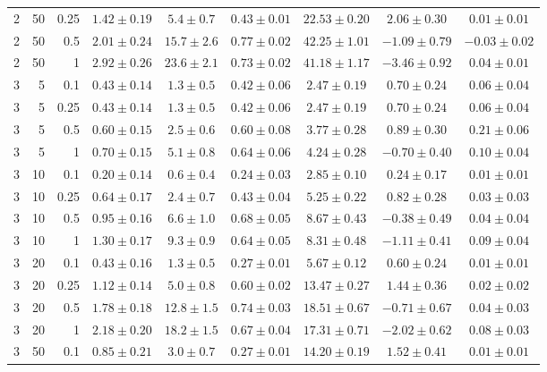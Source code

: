 \begin{table}[htbp]
\begin{tabular}{@{}rrrcccccc@{}}
2 & 50 & 0.25 & $1.42 \pm 0.19$ & $5.4 \pm 0.7$ & $0.43 \pm 0.01$ & $22.53 \pm 0.20$ & $2.06 \pm 0.30$ & $0.01 \pm 0.01$ \\
2 & 50 & 0.5 & $2.01 \pm 0.24$ & $15.7 \pm 2.6$ & $0.77 \pm 0.02$ & $42.25 \pm 1.01$ & $-1.09 \pm 0.79$ & $-0.03 \pm 0.02$ \\
2 & 50 & 1 & $2.92 \pm 0.26$ & $23.6 \pm 2.1$ & $0.73 \pm 0.02$ & $41.18 \pm 1.17$ & $-3.46 \pm 0.92$ & $0.04 \pm 0.01$ \\
\midrule
3 & 5 & 0.1 & $0.43 \pm 0.14$ & $1.3 \pm 0.5$ & $0.42 \pm 0.06$ & $2.47 \pm 0.19$ & $0.70 \pm 0.24$ & $0.06 \pm 0.04$ \\
3 & 5 & 0.25 & $0.43 \pm 0.14$ & $1.3 \pm 0.5$ & $0.42 \pm 0.06$ & $2.47 \pm 0.19$ & $0.70 \pm 0.24$ & $0.06 \pm 0.04$ \\
3 & 5 & 0.5 & $0.60 \pm 0.15$ & $2.5 \pm 0.6$ & $0.60 \pm 0.08$ & $3.77 \pm 0.28$ & $0.89 \pm 0.30$ & $0.21 \pm 0.06$ \\
3 & 5 & 1 & $0.70 \pm 0.15$ & $5.1 \pm 0.8$ & $0.64 \pm 0.06$ & $4.24 \pm 0.28$ & $-0.70 \pm 0.40$ & $0.10 \pm 0.04$ \\
3 & 10 & 0.1 & $0.20 \pm 0.14$ & $0.6 \pm 0.4$ & $0.24 \pm 0.03$ & $2.85 \pm 0.10$ & $0.24 \pm 0.17$ & $0.01 \pm 0.01$ \\
3 & 10 & 0.25 & $0.64 \pm 0.17$ & $2.4 \pm 0.7$ & $0.43 \pm 0.04$ & $5.25 \pm 0.22$ & $0.82 \pm 0.28$ & $0.03 \pm 0.03$ \\
3 & 10 & 0.5 & $0.95 \pm 0.16$ & $6.6 \pm 1.0$ & $0.68 \pm 0.05$ & $8.67 \pm 0.43$ & $-0.38 \pm 0.49$ & $0.04 \pm 0.04$ \\
3 & 10 & 1 & $1.30 \pm 0.17$ & $9.3 \pm 0.9$ & $0.64 \pm 0.05$ & $8.31 \pm 0.48$ & $-1.11 \pm 0.41$ & $0.09 \pm 0.04$ \\
3 & 20 & 0.1 & $0.43 \pm 0.16$ & $1.3 \pm 0.5$ & $0.27 \pm 0.01$ & $5.67 \pm 0.12$ & $0.60 \pm 0.24$ & $0.01 \pm 0.01$ \\
3 & 20 & 0.25 & $1.12 \pm 0.14$ & $5.0 \pm 0.8$ & $0.60 \pm 0.02$ & $13.47 \pm 0.27$ & $1.44 \pm 0.36$ & $0.02 \pm 0.02$ \\
3 & 20 & 0.5 & $1.78 \pm 0.18$ & $12.8 \pm 1.5$ & $0.74 \pm 0.03$ & $18.51 \pm 0.67$ & $-0.71 \pm 0.67$ & $0.04 \pm 0.03$ \\
3 & 20 & 1 & $2.18 \pm 0.20$ & $18.2 \pm 1.5$ & $0.67 \pm 0.04$ & $17.31 \pm 0.71$ & $-2.02 \pm 0.62$ & $0.08 \pm 0.03$ \\
3 & 50 & 0.1 & $0.85 \pm 0.21$ & $3.0 \pm 0.7$ & $0.27 \pm 0.01$ & $14.20 \pm 0.19$ & $1.52 \pm 0.41$ & $0.01 \pm 0.01$ \\

\end{tabular}
\end{table}
